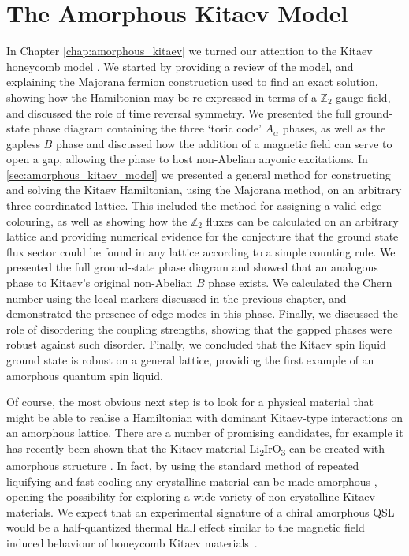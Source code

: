\section{The Amorphous Kitaev Model}

In Chapter \ref{chap:amorphous_kitaev} we turned our attention to the Kitaev honeycomb model \cite{kitaev_anyons_2006}. We started by providing a review of the model, and explaining the Majorana fermion construction used to find an exact solution, showing how the Hamiltonian may be re-expressed in terms of a $\mathbb Z_2$ gauge field, and discussed the role of time reversal symmetry. We presented the full ground-state phase diagram containing the three `toric code' $A_{\alpha}$ phases, as well as the gapless $B$ phase and discussed how the addition of a magnetic field can serve to open a gap, allowing the phase to host non-Abelian anyonic excitations. In \textsection\ref{sec:amorphous_kitaev_model} we presented a general method for constructing and solving the Kitaev Hamiltonian, using the Majorana method, on an arbitrary three-coordinated lattice. This included the method for assigning a valid edge-colouring, as well as showing how the $\mathbb Z_2$ fluxes can be calculated on an arbitrary lattice and providing numerical evidence for the conjecture that the ground state flux sector could be found in any lattice according to a simple counting rule. We presented the full ground-state phase diagram and showed that an analogous phase to Kitaev's original non-Abelian $B$ phase exists. We calculated the Chern number using the local markers discussed in the previous chapter, and demonstrated the presence of edge modes in this phase. Finally, we discussed the role of disordering the coupling strengths, showing that the gapped phases were robust against such disorder. Finally, we concluded that the Kitaev spin liquid ground state is robust on a general lattice, providing the first example of an amorphous quantum spin liquid.

Of course, the most obvious next step is to look for a physical material that might be able to realise a Hamiltonian with dominant Kitaev-type interactions on an amorphous lattice. There are a number of promising candidates, for example it has recently been shown that the Kitaev material Li\textsubscript{2}IrO\textsubscript{3} can be created with amorphous structure \cite{lee_lithiair_2019}. In fact, by using the standard method of repeated liquifying and fast cooling any crystalline material can be made amorphous \cite{zallen_physics_2008,turnbull_under_1969, kaneyoshi_amorphous_2018,petrakovskii_amorphous_1981}, opening the possibility for exploring a wide variety of non-crystalline Kitaev materials. We expect that an experimental signature of a chiral amorphous QSL would be a half-quantized thermal Hall effect similar to the magnetic field induced behaviour of honeycomb Kitaev materials~\cite{kasahara_majorana_2018,yokoi_majorana_2021,yamashita_sample_2020,bruin_robustness_2022}.

